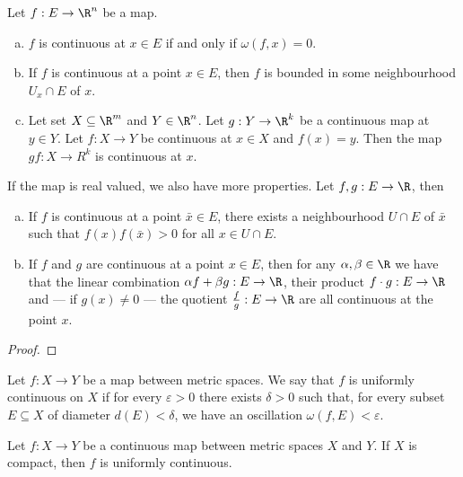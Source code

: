 \begin{proposition}
Let \(f: E \to \R^n\) be a map.
\begin{enumerate}[(a)]
\item \(f\) is continuous at \(x \in E\) if and only if \(\omega(f, x) =
    0\).
\item If \(f\) is continuous at a point \(x \in E\), then \(f\) is bounded
    in some neighbourhood \(U_x \cap E\) of \(x\).
\item Let set \(X \subseteq \R^m\) and \(Y \in \R^n\). Let \(g: Y \to \R^k\)
    be a continuous map at \(y \in Y\). Let \(f: X \to Y\) be continuous at
    \(x \in X\) and \(f(x) = y\). Then the map \(g  f: X \to R^k\) is
    continuous at \(x\).
\end{enumerate}
If the map is real valued, we also have more properties. Let \(f, g: E \to
\R\), then
\begin{enumerate}[(a)]
\item If \(f\) is continuous at a point \(\bar x \in E\), there exists a
    neighbourhood \(U \cap E\) of \(\bar x\) such that \(f(x)f(\bar x) > 0\)
    for all \(x \in U \cap E\).
\item If \(f\) and \(g\) are continuous at a point \(x \in E\), then for any
    \(\alpha, \beta \in \R\) we have that the linear combination \(\alpha f +
    \beta g: E \to \R\), their product \(f \cdot g: E \to \R\) and --- if \(g(x)
    \neq 0\) --- the quotient \(\frac f g: E \to \R\) are all continuous at
    the point \(x\).
\end{enumerate}
\end{proposition}

\begin{proof}
\end{proof}

\begin{definition}\label{def:uniformly-continuous}
Let \(f: X \to Y\) be a map between metric spaces. We say that \(f\) is
uniformly continuous on \(X\) if for every \(\varepsilon > 0\) there exists
\(\delta > 0\) such that, for every subset \(E \subseteq X\) of diameter \(d(E)
< \delta\), we have an oscillation \(\omega(f, E) < \varepsilon\).
\end{definition}

\begin{theorem}
\label{thm:heine-cantor}
Let \(f: X \to Y\) be a continuous map between metric spaces \(X\) and \(Y\). If
\(X\) is compact, then \(f\) is uniformly continuous.
\end{theorem}

